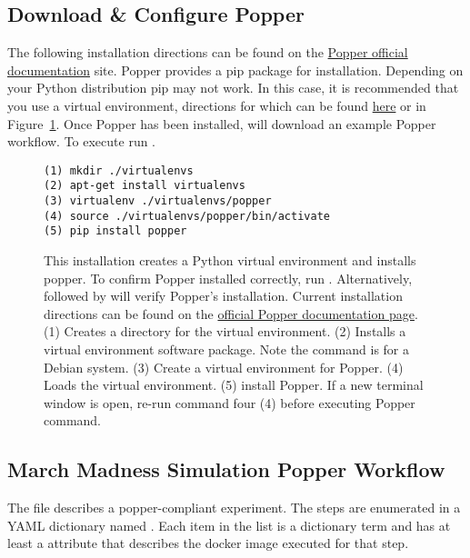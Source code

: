 \documentclass{IEEEtran}
\begin{document}
\subsection{Download \& Configure Popper}
The following installation directions can be found on the \href{https://popper.readthedocs.io/en/latest/sections/getting_started.html#installation}{Popper official documentation} site. Popper provides a pip package for installation. Depending on your Python distribution pip may not work. In this case, it is recommended that you use a virtual environment, directions for which can be found \href{https://popper.readthedocs.io/en/latest/sections/getting_started.html#installation}{here} or in Figure~\ref{venv}. Once Popper has been installed,  will download an example Popper workflow. To execute run .

\begin{figure}[h]
\centering
\begin{mdframed}
\small
\begin{verbatim}
(1) mkdir ./virtualenvs
(2) apt-get install virtualenvs
(3) virtualenv ./virtualenvs/popper
(4) source ./virtualenvs/popper/bin/activate
(5) pip install popper

\end{verbatim}
\end{mdframed}
\caption{\footnotesize This installation creates a Python virtual environment and installs popper. To confirm Popper installed correctly, run . Alternatively,  followed by  will verify Popper's installation. Current installation directions can be found on the  \href{https://popper.readthedocs.io/en/latest/sections/getting\_started.html\#installation}{official Popper documentation page}. (1) Creates a directory for the virtual environment. (2) Installs a virtual environment software package. Note the command is for a Debian system. (3) Create a virtual environment for Popper. (4) Loads the virtual environment. (5) install Popper. If a new terminal window is open, re-run command four (4) before executing Popper command.  }
\label{venv}
\end{figure}

\subsection{March Madness Simulation Popper Workflow}
The  file describes a popper-compliant experiment. The steps are enumerated in a YAML dictionary named . Each item in the list is a dictionary term and has at least a  attribute that describes the docker image executed for that step.
\end{document}
